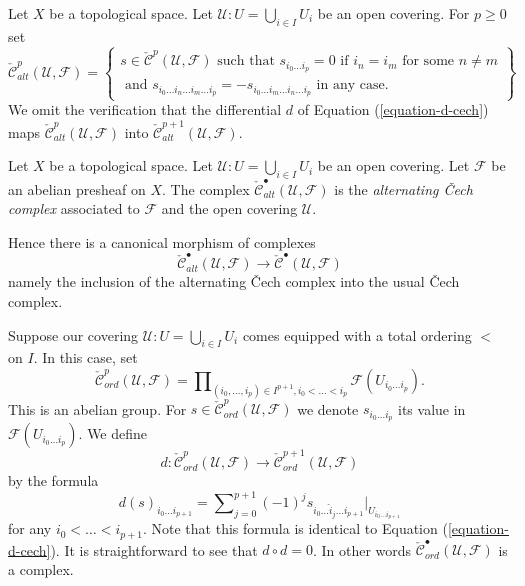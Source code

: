 \medskip\noindent
Let $X$ be a topological space. Let $\mathcal{U} : U = \bigcup_{i \in I} U_i$
be an open covering. For $p \geq 0$ set
$$
\check{\mathcal{C}}_{alt}^p(\mathcal{U}, \mathcal{F})
=
\left\{
\begin{matrix}
s \in  \check{\mathcal{C}}^p(\mathcal{U}, \mathcal{F})
\text{ such that }
s_{i_0 \ldots i_p} = 0 \text{ if } i_n = i_m \text{ for some } n \not = m\\
\text{ and }
s_{i_0\ldots i_n \ldots i_m \ldots i_p}
=
-s_{i_0\ldots i_m \ldots i_n \ldots i_p}
\text{ in any case.}
\end{matrix}
\right\}
$$
We omit the verification that the differential $d$ of
Equation (\ref{equation-d-cech}) maps
$\check{\mathcal{C}}^p_{alt}(\mathcal{U}, \mathcal{F})$ into
$\check{\mathcal{C}}^{p + 1}_{alt}(\mathcal{U}, \mathcal{F})$.

\begin{definition}
\label{definition-alternating-cech-complex}
Let $X$ be a topological space. Let $\mathcal{U} : U = \bigcup_{i \in I} U_i$
be an open covering. Let $\mathcal{F}$ be an abelian presheaf on $X$.
The complex $\check{\mathcal{C}}_{alt}^\bullet(\mathcal{U}, \mathcal{F})$
is the {\it alternating {\v C}ech complex} associated to $\mathcal{F}$ and the
open covering $\mathcal{U}$.
\end{definition}

\noindent
Hence there is a canonical morphism of complexes
$$
\check{\mathcal{C}}_{alt}^\bullet(\mathcal{U}, \mathcal{F})
\longrightarrow
\check{\mathcal{C}}^\bullet(\mathcal{U}, \mathcal{F})
$$
namely the inclusion of the alternating {\v C}ech complex into the
usual {\v C}ech complex.

\medskip\noindent
Suppose our covering $\mathcal{U} : U = \bigcup_{i \in I} U_i$ comes
equipped with a total ordering $<$ on $I$. In this case, set
$$
\check{\mathcal{C}}_{ord}^p(\mathcal{U}, \mathcal{F})
=
\prod\nolimits_{(i_0, \ldots, i_p) \in I^{p + 1}, i_0 < \ldots < i_p}
\mathcal{F}(U_{i_0\ldots i_p}).
$$
This is an abelian group. For
$s \in \check{\mathcal{C}}_{ord}^p(\mathcal{U}, \mathcal{F})$ we denote
$s_{i_0\ldots i_p}$ its value in $\mathcal{F}(U_{i_0\ldots i_p})$.
We define
$$
d : \check{\mathcal{C}}_{ord}^p(\mathcal{U}, \mathcal{F})
\longrightarrow
\check{\mathcal{C}}_{ord}^{p + 1}(\mathcal{U}, \mathcal{F})
$$
by the formula
$$
d(s)_{i_0\ldots i_{p + 1}}
=
\sum\nolimits_{j = 0}^{p + 1}
(-1)^j
s_{i_0\ldots \hat i_j \ldots i_{p + 1}}|_{U_{i_0\ldots i_{p + 1}}}
$$
for any $i_0 < \ldots < i_{p + 1}$. Note that this formula is identical
to Equation (\ref{equation-d-cech}).
It is straightforward to see that $d \circ d = 0$. In other words
$\check{\mathcal{C}}_{ord}^\bullet(\mathcal{U}, \mathcal{F})$ is a complex.

